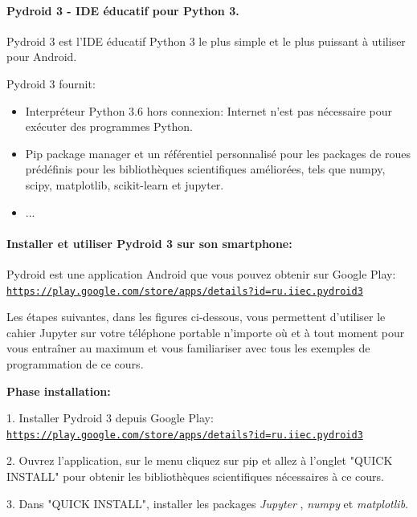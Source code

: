 \documentclass[%
oneside,                 %
final,                   %
10pt]{article}
\begin{document}
\paragraph{Pydroid 3 - IDE éducatif pour Python 3.}
Pydroid 3 est l'IDE éducatif Python 3 le plus simple et le plus puissant à utiliser pour Android.

Pydroid 3 fournit:

\begin{itemize}
\item Interpréteur Python 3.6 hors connexion: Internet n'est pas nécessaire pour exécuter des programmes Python.

\item Pip package manager et un référentiel personnalisé pour les packages de roues prédéfinis pour les bibliothèques scientifiques améliorées, tels que numpy, scipy, matplotlib, scikit-learn et jupyter.

\item ...
\end{itemize}

\noindent
\paragraph{Installer et utiliser Pydroid 3 sur son smartphone:}

Pydroid est une application Android que vous pouvez obtenir sur Google Play: \href{{https://play.google.com/store/apps/details?id=ru.iiec.pydroid3}}{\nolinkurl{https://play.google.com/store/apps/details?id=ru.iiec.pydroid3}}

Les étapes suivantes, dans les figures ci-dessous, vous permettent d’utiliser le cahier Jupyter sur votre téléphone portable n’importe où et à tout moment pour vous entraîner au maximum et vous familiariser avec tous les exemples de programmation de ce cours.

\textbf{Phase installation:}

1. Installer Pydroid 3 depuis Google Play: \href{{https://play.google.com/store/apps/details?id=ru.iiec.pydroid3}}{\nolinkurl{https://play.google.com/store/apps/details?id=ru.iiec.pydroid3}}

2. Ouvrez l'application, sur le menu cliquez sur pip et allez à l'onglet "QUICK INSTALL" pour obtenir les bibliothèques scientifiques nécessaires à ce cours.

3. Dans "QUICK INSTALL", installer les packages \emph{Jupyter} , \emph{numpy} et \emph{matplotlib}.
\end{document}
